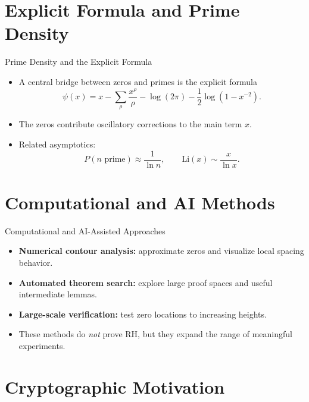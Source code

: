 \documentclass[aspectratio=43]{beamer}
\begin{document}
\section{Explicit Formula and Prime Density}

\begin{frame}{Prime Density and the Explicit Formula}
\begin{itemize}
    \item A central bridge between zeros and primes is the explicit formula
    \[
    \psi(x)=x-\sum_\rho \frac{x^\rho}{\rho}-\log(2\pi)-\frac12\log(1-x^{-2}).
    \]
    \item The zeros contribute oscillatory corrections to the main term $x$.
    \item Related asymptotics:
    \[
    P(n\text{ prime})\approx \frac{1}{\ln n}, \qquad \mathrm{Li}(x)\sim \frac{x}{\ln x}.
    \]
\end{itemize}
\end{frame}

\section{Computational and AI Methods}

\begin{frame}{Computational and AI-Assisted Approaches}
\begin{itemize}
    \item \textbf{Numerical contour analysis:} approximate zeros and visualize local spacing behavior.
    \item \textbf{Automated theorem search:} explore large proof spaces and useful intermediate lemmas.
    \item \textbf{Large-scale verification:} test zero locations to increasing heights.
    \item These methods do \emph{not} prove RH, but they expand the range of meaningful experiments.
\end{itemize}
\end{frame}

\section{Cryptographic Motivation}
\end{document}

